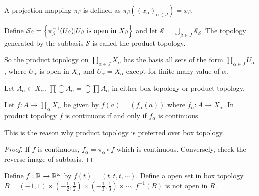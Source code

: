 \begin{definition}
    A projection mapping $\pi_\beta$ is defined as $\pi_\beta \left( (x_{\alpha})_{\alpha \in J} \right) = x_\beta$.
\end{definition}

\begin{definition}
    Define $\mathcal{S}_{\beta} = \set{\pi_{\beta}^{-1}(U_{\beta}) | U_{\beta}\text{ is open in }X_{\beta}}$ and let $\mathcal{S} = \displaystyle \bigcup_{\beta \in J} \mathcal{S}_{\beta}$. The topology generated by the subbasis $\mathcal{S}$ is called the product topology. 
    
    So the product topology on $\displaystyle \prod_{\alpha \in J} X_{\alpha}$ has the basis all sets of the form $\displaystyle \prod_{\alpha \in J} U_{\alpha}$, where $U_{\alpha}$ is open in $X_{\alpha}$ and $U_{\alpha} = X_{\alpha}$ except for finite many value of $\alpha$.
\end{definition}

\begin{theorem}
Let $A_{\alpha} \subset X_{\alpha}$. $\displaystyle \prod \closure{A_{\alpha}} = \closure{\prod A_{\alpha}}$ in either box topology or product topology.
\end{theorem}


\begin{theorem}
Let $\displaystyle f : A \rightarrow \prod_{\alpha} X_{\alpha}$ be given by $f(a) = \left( f_{\alpha}(a) \right)$ where $f_{\alpha} : A \rightarrow X_{\alpha}$. In product topology $f$ is continuous if and only if $f_{\alpha}$ is continuous.

This is the reason why product topology is preferred over box topology.
\end{theorem}
\begin{proof}
    If $f$ is continuous, $f_\alpha = \pi_\alpha \circ f$ which is continuous. Conversely, check the reverse image of subbasis.
\end{proof}

\begin{example}
    Define $f: \mathbb{R} \rightarrow \mathbb{R}^{\omega}$ by $f(t) = (t,t,t, \cdots)$. Define a open set in box topology $B = (-1, 1) \times (- \frac{1}{2}, \frac{1}{2}) \times  (- \frac{1}{3}, \frac{1}{3}) \times \cdots$. $f^{-1}(B)$ is not open in $R$.
\end{example}



